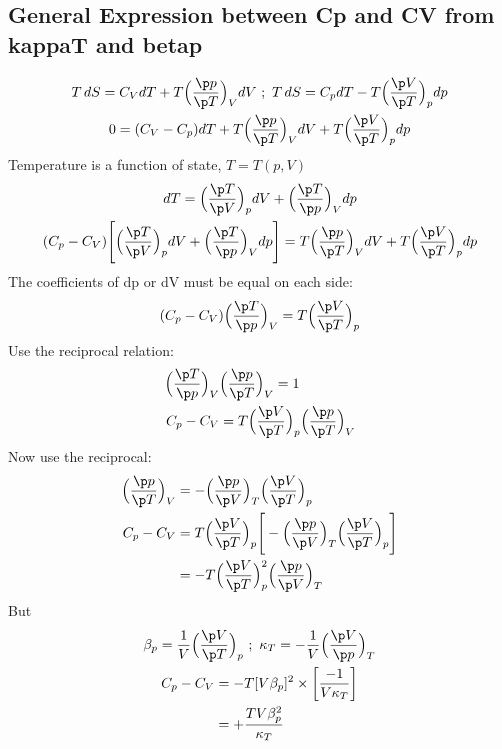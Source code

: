 \documentclass[a4paper, 11pt, normalem]{report}
\begin{document}
\subsection{General Expression between Cp and CV from kappaT and betap}
\begin{gather*}
    T\,dS = C_V dT + T\Big(\frac{\p p}{\p T}\Big)_V dV ~;~ T\,dS = C_p dT - T\Big(\frac{\p V}{\p T}\Big)_p dp \\
    0 = (C_V - C_p)dT + T \Big(\frac{\p p}{\p T}\Big)_V dV + T\Big(\frac{\p V}{\p T}\Big)_p dp
\end{gather*}
Temperature is a function of state, $T = T(p,V)$
\begin{gather*}
    dT = \Big(\frac{\p T}{\p V}\Big)_p dV + \Big(\frac{\p T}{\p p}\Big)_V dp \\
    (C_p - C_V)\Bigg[\Big(\frac{\p T}{\p V}\Big)_p dV + \Big(\frac{\p T}{\p p}\Big)_V dp \Bigg] = T \Big(\frac{\p p}{\p T}\Big)_V dV + T\Big(\frac{\p V}{\p T}\Big)_p dp
\end{gather*}
The coefficients of dp or dV must be equal on each side:
\begin{equation*}
    (C_p - C_V)\Big(\frac{\p T}{\p p}\Big)_V = T\Big(\frac{\p V}{\p T}\Big)_p
\end{equation*}
Use the reciprocal relation:
\begin{align*}
    \Big(\frac{\p T}{\p p}\Big)_V &\Big(\frac{\p p}{\p T}\Big)_V = 1 \\
    C_p - C_V &= T\Big(\frac{\p V}{\p T}\Big)_p \Big(\frac{\p p}{\p T}\Big)_V
\end{align*}
Now use the reciprocal:
\begin{align*}
    \Big(\frac{\p p}{\p T}\Big)_V &= -\Big(\frac{\p p}{\p V}\Big)_T \Big(\frac{\p V}{\p T}\Big)_p \\
    C_p - C_V &= T\Big(\frac{\p V}{\p T}\Big)_p \Bigg[-\Big(\frac{\p p}{\p V}\Big)_T \Big(\frac{\p V}{\p T}\Big)_p \Bigg] \\
    &= -T\Big(\frac{\p V}{\p T}\Big)_{p}^2 \Big(\frac{\p p}{\p V}\Big)_T
\end{align*}
But
\begin{gather*}
    \beta_p = \frac{1}{V} \Big(\frac{\p V}{\p T}\Big)_{p} ~;~ \kappa_T = -\frac{1}{V} \Big(\frac{\p V}{\p p}\Big)_{T} \\
    \begin{aligned}
        C_p - C_V &= -T[V\beta_p]^2 \times \bigg[\frac{-1}{V\kappa_T}\bigg] \\
        &= + \frac{TV\beta_{p}^2}{\kappa_T}
    \end{aligned}
\end{gather*}
\end{document}

